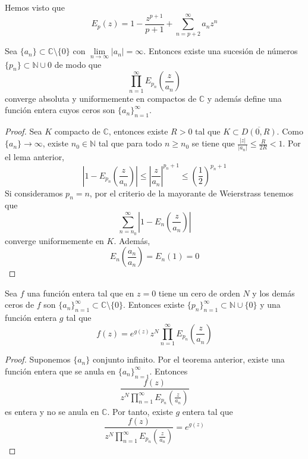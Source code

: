 \begin{remark}
    Hemos visto que
    $$E_p(z) = 1 - \frac{z^{p+1}}{p+1} + \sum_{n=p+2}^\infty a_nz^n$$
\end{remark}

\begin{theorem}
    Sea $\{a_n\} \subset \mathbb{C} \setminus \{0\}$ con $\lim\limits_{n \to \infty} |a_n| = \infty$.
    Entonces existe una sucesión de números $\{p_n\} \subset \mathbb{N} \cup 0$ de modo que
    $$\prod_{n=1}^\infty E_{p_n}\left(\frac{z}{a_n}\right)$$
    converge absoluta y uniformemente en compactos de $\mathbb{C}$ y además define una función entera cuyos ceros son $\{a_n\}_{n=1}^\infty$.
\end{theorem}

\begin{proof}
    Sea $K$ compacto de $\mathbb{C}$, entonces existe $R > 0$ tal que $K \subset \overline{D(0, R)}$.
    Como $\{a_n\} \to \infty$, existe $n_0 \in \mathbb{N}$ tal que para todo $n \geq n_0$ se tiene que $\frac{|z|}{|a_n|} \leq \frac{R}{2R} < 1$.
    Por el lema anterior,
    $$\left|1-E_{p_n}\left(\frac{z}{a_n}\right)\right| \leq \left|\frac{z}{a_n}\right|^{p_n+1} \leq \left(\frac{1}{2}\right)^{p_n+1}$$
    Si consideramos $p_n = n$, por el criterio de la mayorante de Weierstrass tenemos que
    $$\sum_{n=n_0}^\infty \left|1-E_n\left(\frac{z}{a_n}\right)\right|$$
    converge uniformemente en $K$.
    Además,
    $$E_n\left(\frac{a_n}{a_n}\right) = E_n(1) = 0$$
\end{proof}

\begin{theorem}
    Sea $f$ una función entera tal que en $z = 0$ tiene un cero de orden $N$ y los demás ceros de $f$ son $\{a_n\}_{n=1}^\infty \subset \mathbb{C} \setminus \{0\}$.
    Entonces existe $\{p_n\}_{n=1}^\infty \subset \mathbb{N} \cup \{0\}$ y una función entera $g$ tal que
    $$f(z) = e^{g(z)}z^N\prod_{n=1}^\infty E_{p_n}\left(\frac{z}{a_n}\right)$$
\end{theorem}

\begin{proof}
    Suponemos $\{a_n\}$ conjunto infinito.
    Por el teorema anterior, existe una función entera que se anula en $\{a_n\}_{n=1}^\infty$.
    Entonces
    $$\frac{f(z)}{z^N\prod_{n=1}^\infty E_{p_n}\left(\frac{z}{a_n}\right)}$$
    es entera y no se anula en $\mathbb{C}$.
    Por tanto, existe $g$ entera tal que
    $$\frac{f(z)}{z^N\prod_{n=1}^\infty E_{p_n}\left(\frac{z}{a_n}\right)} = e^{g(z)}$$
\end{proof}

